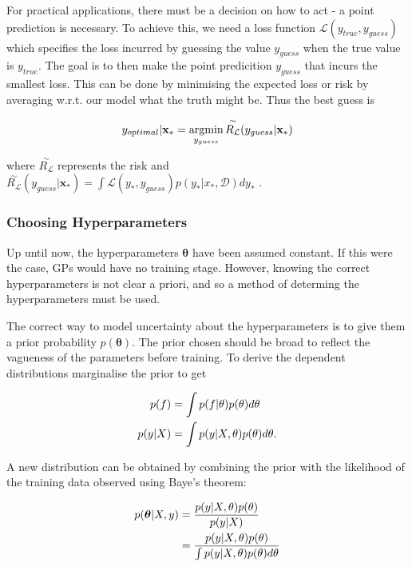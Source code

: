 \documentclass[12pt,a4paper]{report}
\theoremstyle{definition}
\begin{document}
For practical applications, there must be a decision on how to act - a point prediction is necessary. 
To achieve this, we need a loss function $\mathcal{L}(y_{true}, y_{guess})$ which specifies the loss incurred by guessing the value $y_{guess}$ when the true value is $y_{true}$. 
The goal is to then make the point predicition $y_{guess}$ that incurs the smallest loss.
This can be done by minimising the expected loss or risk by averaging w.r.t. our model what the truth might be.
Thus the best guess is 

\begin{equation}
	\centering
	y_{optimal} | \textbf{x}_{*} = \underset{y_{guess}}{\textrm{argmin}} \, \overset{\sim}{R_{\mathcal{L}}}(y_{guess} | \textbf{x}_{*})
\end{equation}

where $\overset{\sim}{R_{\mathcal{L}}}$ represents the risk and $\overset{\sim}{R_{\mathcal{L}}}(y_{guess} | \textbf{x}_{*}) = \int \mathcal{L}(y_{*}, y_{guess}) p(y_{*} | x_{*}, \mathcal{D}) dy_{*}$ \citep{RasmussenWilliams2006}.

\subsubsection{Choosing Hyperparameters}

Up until now, the hyperparameters $\boldsymbol{\theta}$ have been assumed constant.
If this were the case, GPs would have no training stage. 
However, knowing the correct hyperparameters is not clear a priori, and so a method of determing the hyperparameters must be used.

The correct way to model uncertainty about the hyperparameters is to give them a prior probability $p(\boldsymbol{\theta})$.
The prior chosen should be broad to reflect the vagueness of the parameters before training.
To derive the dependent distributions marginalise the prior to get

\begin{equation}
	\begin{aligned}
		\centering
		p(f) &= \int p(f | \theta) p(\theta) d\theta \\
		p(y | X) &= \int p(y | X, \theta) p(\theta) d\theta.
	\end{aligned}
\end{equation}

A new distribution can be obtained by combining the prior with the likelihood of the training data observed using Baye's theorem:

\begin{equation}
	\label{eq:ChooseHyper}
	\begin{aligned}
		\centering
		p(\boldsymbol{\theta} | X, y) &= \frac{p(y | X, \theta) p(\theta)}{p(y | X)} \\
		&= \frac{p(y | X, \theta) p(\theta)}{\int p(y | X, \theta) p(\theta) d\theta} 
	\end{aligned}
\end{equation}
\end{document}
